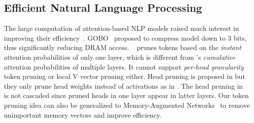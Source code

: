 \subsection{Efficient Natural Language Processing}
The large computation of attention-based NLP models raised much interest in improving their efficiency~\cite{hanruiwang2020hat, yan2020micronet, gu2018nonautoregressive, wang2020efficient}. GOBO~\cite{zadeh2020gobo} proposed to compress \bert model down to 3 bits, thus significantly reducing DRAM access. \powerbert~\cite{goyal2020power} prunes tokens based on the \emph{instant} attention probabilities of only one layer, which is different from \name's \emph{cumulative} attention probabilities of multiple layers. It cannot support \emph{per-head granularity} token pruning or local V vector pruning either. Head pruning is proposed in \cite{michel2019sixteen, voita2019analyzing} but they only prune head weights instead of activations as in \name. The head pruning in~\cite{voita2019analyzing} is not cascaded since pruned heads in one layer appear in latter layers. Our token pruning idea can also be generalized to Memory-Augmented Networks~\cite{NIPS2015_5846} to remove unimportant memory vectors and improve efficiency. 
